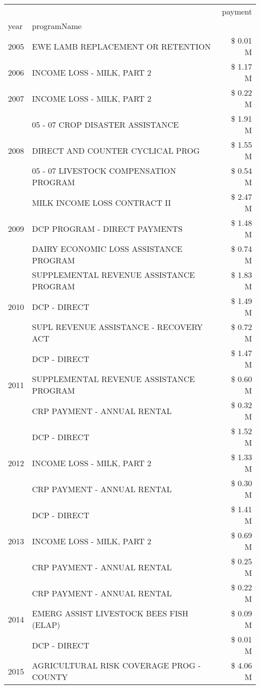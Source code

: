 \begin{tabular}{llr}
\toprule
 &  & payment \\
year & programName &  \\
\midrule
2005 & EWE LAMB REPLACEMENT OR RETENTION & \$ 0.01 M \\
\cline{1-3}
2006 & INCOME LOSS - MILK, PART 2 & \$ 1.17 M \\
\cline{1-3}
2007 & INCOME LOSS - MILK, PART 2 & \$ 0.22 M \\
\cline{1-3}
\multirow[t]{3}{*}{2008} & 05 - 07 CROP DISASTER ASSISTANCE & \$ 1.91 M \\
 & DIRECT AND COUNTER CYCLICAL PROG & \$ 1.55 M \\
 & 05 - 07 LIVESTOCK COMPENSATION PROGRAM & \$ 0.54 M \\
\cline{1-3}
\multirow[t]{3}{*}{2009} & MILK INCOME LOSS CONTRACT II & \$ 2.47 M \\
 & DCP PROGRAM - DIRECT PAYMENTS & \$ 1.48 M \\
 & DAIRY ECONOMIC LOSS ASSISTANCE PROGRAM & \$ 0.74 M \\
\cline{1-3}
\multirow[t]{3}{*}{2010} & SUPPLEMENTAL REVENUE ASSISTANCE PROGRAM & \$ 1.83 M \\
 & DCP - DIRECT & \$ 1.49 M \\
 & SUPL REVENUE ASSISTANCE - RECOVERY ACT & \$ 0.72 M \\
\cline{1-3}
\multirow[t]{3}{*}{2011} & DCP - DIRECT & \$ 1.47 M \\
 & SUPPLEMENTAL REVENUE ASSISTANCE PROGRAM & \$ 0.60 M \\
 & CRP PAYMENT - ANNUAL RENTAL & \$ 0.32 M \\
\cline{1-3}
\multirow[t]{3}{*}{2012} & DCP - DIRECT & \$ 1.52 M \\
 & INCOME LOSS - MILK, PART 2 & \$ 1.33 M \\
 & CRP PAYMENT - ANNUAL RENTAL & \$ 0.30 M \\
\cline{1-3}
\multirow[t]{3}{*}{2013} & DCP - DIRECT & \$ 1.41 M \\
 & INCOME LOSS - MILK, PART 2 & \$ 0.69 M \\
 & CRP PAYMENT - ANNUAL RENTAL & \$ 0.25 M \\
\cline{1-3}
\multirow[t]{3}{*}{2014} & CRP PAYMENT - ANNUAL RENTAL & \$ 0.22 M \\
 & EMERG ASSIST LIVESTOCK BEES FISH (ELAP) & \$ 0.09 M \\
 & DCP - DIRECT & \$ 0.01 M \\
\cline{1-3}
\multirow[t]{3}{*}{2015} & AGRICULTURAL RISK COVERAGE PROG - COUNTY & \$ 4.06 M \\

\end{tabular}
